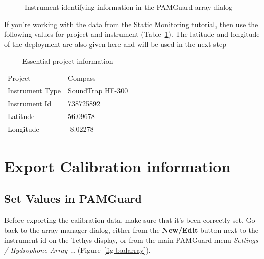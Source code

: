 \documentclass[
]{article}
\begin{document}
\begin{figure}


\caption{\label{fig-instrument}Instrument identifying information in the
PAMGuard array dialog}

\end{figure}%

If you're working with the data from the Static Monitoring tutorial,
then use the following values for project and instrument
(Table~\ref{tbl-identify}). The latitude and longitude of the deployment
are also given here and will be used in the next step

\begin{longtable}[]{@{}ll@{}}
\caption{Essential project
information}\label{tbl-identify}\tabularnewline
\toprule\noalign{}
\endfirsthead
\endhead
\bottomrule\noalign{}
\endlastfoot
Project & Compass \\
Instrument Type & SoundTrap HF-300 \\
Instrument Id & 738725892 \\
Latitude & 56.09678 \\
Longitude & -8.02278 \\
\end{longtable}

\section{Export Calibration
information}\label{export-calibration-information}

\subsection{Set Values in PAMGuard}\label{set-values-in-pamguard}

Before exporting the calibration data, make sure that it's been
correctly set. Go back to the array manager dialog, either from the
\textbf{New/Edit} button next to the instrument id on the Tethys
display, or from the main PAMGuard menu \emph{Settings / Hydrophone
Array \ldots{}} (Figure~\ref{fig-badarray}).
\end{document}
